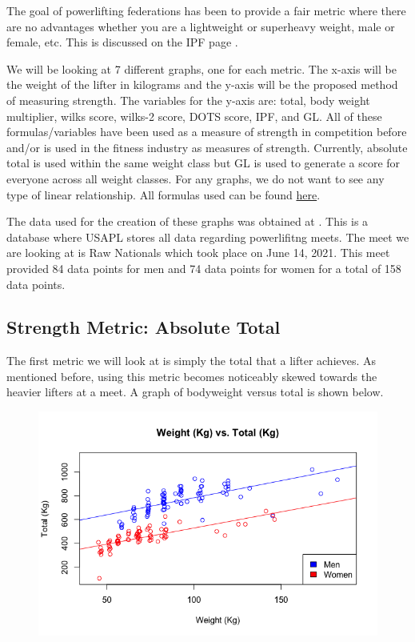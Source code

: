 \documentclass[10pt,letterpaper]{article}
\begin{document}
    The goal of powerlifting federations has been to provide a fair metric where there are no advantages whether you are a lightweight or superheavy weight, male or female, etc. This is discussed on the IPF page \cite{ipfPage}.

    We will be looking at 7 different graphs, one for each metric. The x-axis will be the weight of the lifter in kilograms and the y-axis will be the proposed method of measuring strength. The variables for the y-axis are: total, body weight multiplier, wilks score, wilks-2 score, DOTS score, IPF, and GL. All of these formulas/variables have been used as a measure of strength in competition before and/or is used in the fitness industry as measures of strength. Currently, absolute total is used within the same weight class but GL is used to generate a score for everyone across all weight classes. For any graphs, we do not want to see any type of linear relationship. All formulas used can be found \href{https://www.powerlifting.sport/fileadmin/ipf/data/ipf-formula/Models_Evaluation-I-2020.pdf}{here}.

    The data used for the creation of these graphs was obtained at \cite{data}. This is a database where USAPL stores all data regarding powerlifitng meets. The meet we are looking at is Raw Nationals which took place on June 14, 2021. This meet provided 84 data points for men and 74 data points for women for a total of 158 data points.

    \subsection{Strength Metric: Absolute Total}
    The first metric we will look at is simply the total that a lifter achieves. As mentioned before, using this metric becomes noticeably skewed towards the heavier lifters at a meet. A graph of bodyweight versus total is shown below. 

    \begin{figure}[H]
        \center 
        \includegraphics[width=35em]{weightVStotal.png}
        \label{total}
    \end{figure}
\end{document}
